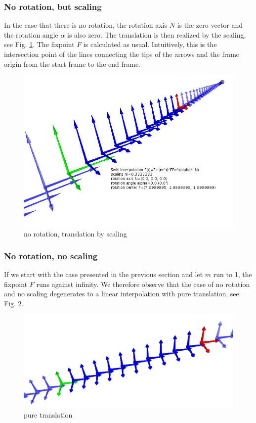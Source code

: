 \documentclass[journal, letterpaper]{IEEEtran}
\begin{document}
\subsubsection{No rotation, but scaling}\label{NoRot}
In the case that there is no rotation, the rotation axis $N$ is the zero vector and the rotation angle $\alpha$ is also zero.
The translation is then realized by the scaling, see Fig. \ref{fig:P2}. The fixpoint $F$ is calculated as usual. Intuitively, this is the intersection point of the lines connecting the tips of the arrows and the frame origin from the start frame to the end frame.
\begin{figure}
	\centering
		\includegraphics[scale=0.4]{pictures/P2.png}
	\caption{no rotation, translation by scaling}
	\label{fig:P2}
\end{figure}

\subsubsection{No rotation, no scaling}
If we start with the case presented in the previous section and let $m$ run to 1, the fixpoint $F$ runs against infinity. We therefore observe that the case of no rotation and no scaling degenerates to a linear interpolation with pure translation, see Fig. \ref{fig:P5}.
\begin{figure}
	\centering
		\includegraphics[scale=0.4]{pictures/P5.png}
	\caption{pure translation}
	\label{fig:P5}
\end{figure}
\end{document}
